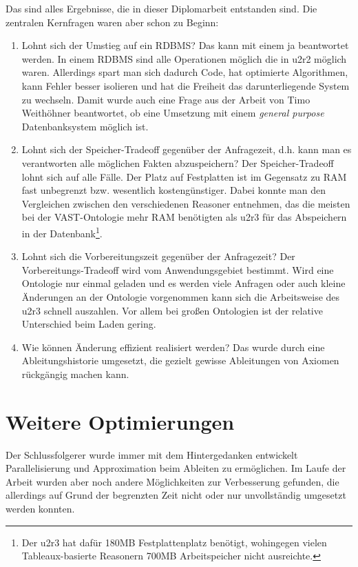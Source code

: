 Das sind alles Ergebnisse, die in dieser Diplomarbeit entstanden sind. Die zentralen Kernfragen waren aber schon zu Beginn:
\begin{enumerate}
  \item Lohnt sich der Umstieg auf ein RDBMS? Das kann mit einem ja beantwortet werden. In einem RDBMS sind alle Operationen möglich die in u2r2 möglich waren. Allerdings spart man sich dadurch Code, hat optimierte Algorithmen, kann Fehler besser isolieren und hat die Freiheit das darunterliegende System zu wechseln. Damit wurde auch eine Frage aus der Arbeit von Timo Weithöhner \cite{Weithoehner2003} beantwortet, ob eine Umsetzung mit einem \emph{general purpose} Datenbanksystem möglich ist.
  \item Lohnt sich der Speicher-Tradeoff gegenüber der Anfragezeit, d.h. kann man es verantworten alle möglichen Fakten abzuspeichern? Der Speicher-Tradeoff lohnt sich auf alle Fälle. Der Platz auf Festplatten ist im Gegensatz zu RAM fast unbegrenzt bzw. wesentlich kostengünstiger. Dabei konnte man den Vergleichen zwischen den verschiedenen Reasoner entnehmen, das die meisten bei der VAST-Ontologie mehr RAM benötigten als u2r3 für das Abspeichern in der Datenbank\footnote{Der u2r3 hat dafür 180MB Festplattenplatz benötigt, wohingegen vielen Tableaux-basierte Reasonern 700MB Arbeitspeicher nicht ausreichte.}.
  \item Lohnt sich die Vorbereitungszeit gegenüber der Anfragezeit? Der Vorbereitungs-Tradeoff wird vom Anwendungsgebiet bestimmt. Wird eine Ontologie nur einmal geladen und es werden viele Anfragen oder auch kleine Änderungen an der Ontologie vorgenommen kann sich die Arbeitsweise des u2r3 schnell auszahlen. Vor allem bei großen Ontologien ist der relative Unterschied beim Laden gering.
  \item Wie können Änderung effizient realisiert werden? Das wurde durch eine Ableitungshistorie umgesetzt, die gezielt gewisse Ableitungen von Axiomen rückgängig machen kann.
\end{enumerate}

\section{Weitere Optimierungen}
\label{abschnitt-weitere-optimierungen}
Der Schlussfolgerer wurde immer mit dem  Hintergedanken entwickelt Parallelisierung und Approximation beim Ableiten zu ermöglichen. Im Laufe der Arbeit wurden aber noch andere Möglichkeiten zur Verbesserung gefunden, die allerdings auf Grund der begrenzten Zeit nicht oder nur unvollständig umgesetzt werden konnten.

